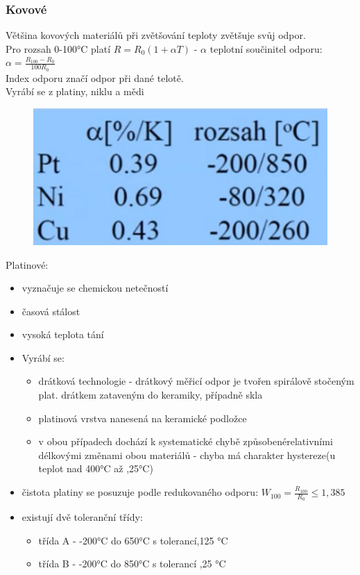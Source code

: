 \subsubsection*{Kovové}
Většina kovových materiálů při zvětšování teploty zvětšuje svůj odpor.\\
Pro rozsah 0-100°C platí $R = R_0(1+\alpha T)$ - $\alpha$ teplotní součinitel odporu: $\alpha = \frac{R_100-R_0}{100R_0}$\\
Index odporu značí odpor při dané telotě.\\
Vyrábí se z platiny, niklu a mědi\\
\begin{figure}[H]
    \includegraphics*[scale = 0.2]{img/odporoveSnimace.png}
\end{figure}
Platinové:
\begin{itemize}
    \item vyznačuje se chemickou netečností
    \item časová stálost
    \item vysoká teplota tání
    \item Vyrábí se:
          \begin{itemize}
              \item drátková technologie - drátkový měřicí odpor je tvořen spirálově stočeným plat. drátkem zataveným do keramiky, případně skla
              \item platinová vrstva nanesená na keramické podložce
              \item v obou případech dochází k systematické chybě  způsobenérelativními délkovými změnami obou materiálů - chyba má charakter hystereze(u teplot nad 400°C až ,25°C)
          \end{itemize}
    \item čistota platiny se posuzuje podle redukovaného odporu: $W_{100} = \frac{R_{100}}{R_0} \leq 1,385$
    \item existují dvě toleranční třídy:
          \begin{itemize}
              \item třída A - -200°C do 650°C s tolerancí,125 °C
              \item třída B - -200°C do 850°C s tolerancí ,25 °C
          \end{itemize}
\end{itemize}
